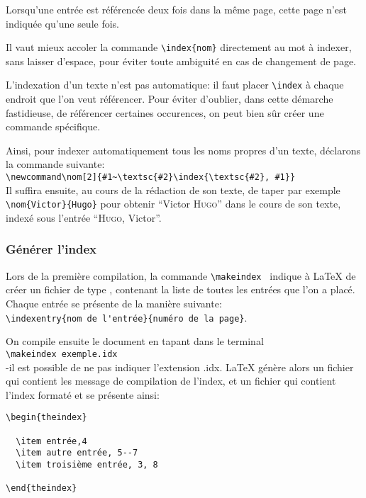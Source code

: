  Lorsqu'une entrée est référencée deux fois dans la même page, cette page n'est indiquée qu'une seule fois. 

\begin{attention}
Il vaut mieux accoler la commande \verb+\index{nom}+ directement au  mot à indexer, sans laisser d'espace, pour éviter toute ambiguité en cas de changement de page.

\end{attention}

L'indexation d'un texte n'est pas automatique: il faut placer \verb+\index+ à chaque endroit  que l'on veut référencer. Pour éviter d'oublier, dans cette démarche fastidieuse, de référencer certaines occurences, on  peut bien sûr créer une commande  spécifique.

Ainsi, pour indexer automatiquement tous les noms propres d'un texte, déclarons la commande suivante:\\
 \verb+\newcommand\nom[2]{#1~\textsc{#2}\index{\textsc{#2}, #1}}+\\
Il suffira ensuite, au cours de la rédaction de son texte, de taper par exemple \verb|\nom{Victor}{Hugo}| pour obtenir \enquote{Victor \textsc{Hugo}} dans le cours de son texte, indexé sous l'entrée \enquote{\textsc{Hugo}, Victor}.


\subsubsection{Générer l'index}


 Lors de la première compilation, la commande \verb|\makeindex | indique à \LaTeX{} de créer un fichier de type , contenant la liste de toutes les entrées que l'on a placé. Chaque entrée se présente de la manière suivante:\\
\verb+\indexentry{nom de l'entrée}{numéro de la page}+.

On compile ensuite le document en tapant dans le terminal \\ \verb+\makeindex exemple.idx + \\
-il est possible de ne pas indiquer l'extension .idx. \LaTeX{} génère alors un fichier  qui contient les message de compilation de l'index, et un fichier  qui contient l'index formaté et se présente ainsi:
\begin{verbatim}
\begin{theindex}

  \item entrée,4
  \item autre entrée, 5--7
  \item troisième entrée, 3, 8	

\end{theindex} 

\end{verbatim}

